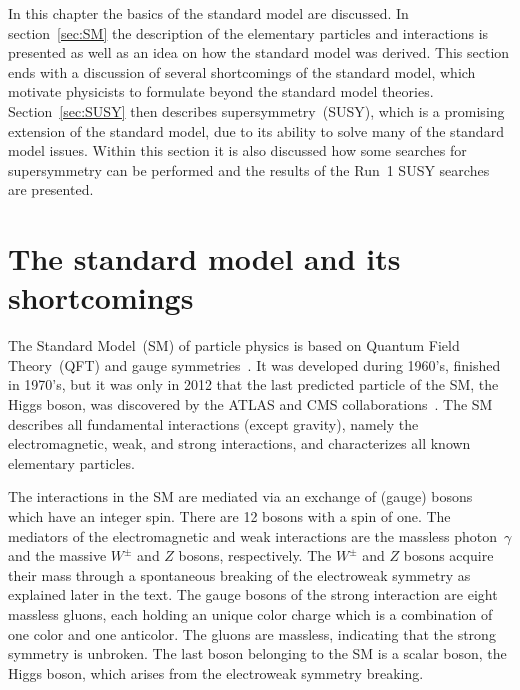 \clearpage

\setcounter{secnumdepth}{4}
\setcounter{secnumdepth}{4}

In this chapter the basics of the standard model are discussed. In section~\ref{sec:SM} the description of the elementary particles and interactions is presented as well as an idea on how the standard model was derived. This section ends with a discussion of several shortcomings of the standard model, which motivate physicists to formulate beyond the standard model theories. Section~\ref{sec:SUSY} then describes supersymmetry~(SUSY), which is a promising extension of the standard model, due to its ability to solve many of the standard model issues. Within this section it is also discussed how some searches for supersymmetry can be performed and  the results of the Run~1 SUSY searches are presented. 

\section{The standard model and its shortcomings~\label{sec:SM}}

The Standard Model~(SM) of particle physics is based on Quantum Field Theory~(QFT) and gauge symmetries~\cite{9783527406012}. It was developed during 1960's, finished in 1970's, but it was only in 2012 that the last predicted particle of the SM, the Higgs boson, was discovered by the ATLAS and CMS collaborations~\cite{Chatrchyan:2012xdj, Aad:2012tfa}. The SM describes all fundamental interactions (except gravity), namely the electromagnetic, weak, and strong interactions, and characterizes all known elementary particles. 


The interactions in the SM are mediated via an exchange of (gauge) bosons which have an integer spin. There are 12 bosons with a spin of one. The mediators of the electromagnetic and weak interactions are the massless photon~$\gamma$ and the massive $W^{\pm}$ and $Z$ bosons, respectively. The $W^{\pm}$ and $Z$ bosons acquire their mass through a spontaneous breaking of the electroweak symmetry as explained later in the text. The gauge bosons of the strong interaction are eight massless gluons, each holding an unique color charge which is a combination of one color and one anticolor. The gluons are massless, indicating that the strong symmetry is unbroken. The last boson belonging to the SM is a scalar boson, the Higgs boson, which arises from the electroweak symmetry breaking. 

